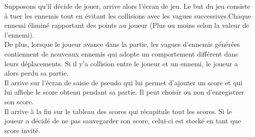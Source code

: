 \documentclass{article}
\begin{document}
Supposons qu'il décide de jouer, arrive alors l'écran de jeu.
Le but du jeu consiste à tuer les ennemis tout en évitant les collisions avec les vagues successives.Chaque ennemi éliminé rapportant des points au joueur (Plus ou moins selon la valeur de l'ennemi). \\
De plus, lorsque le joueur avance dans la partie, les vagues d'ennemis générées contiennent de nouveaux ennemis qui adopte un comportement différent dans leurs déplacements. 
Si il y'a collision entre le joueur et un ennemi, le joueur a alors perdu sa partie. \\ 
Il arrive sur l'écran de saisie de pseudo qui lui permet d'ajouter un score et qui lui affiche le score obtenu pendant sa partie. Il peut choisir ou non d'enregistrer son score. \\ 
Il arrive à la fin sur le tableau des scores qui récapitule tout les scores. Si le joueur a décidé de ne pas sauvegarder son score, celui-ci est stocké en tant que score invité. 
\end{document}
